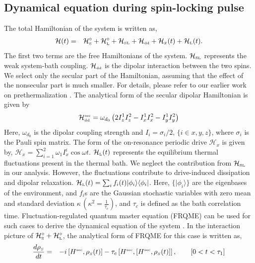\documentclass[pra,aps,preprint,floatfix]{revtex4-1}
\newcommand{\hs}{\mathcal{H}_{\scriptscriptstyle \rm S}}
\newcommand{\hl}{\mathcal{H}_{\scriptscriptstyle \rm L}}
\newcommand{\hsl}{\mathcal{H}_{\scriptscriptstyle \rm SL}}
\newcommand{\hdd}{\mathcal{H}_{\scriptscriptstyle \rm dd}}
\newcommand{\rh}{\rho_{\scriptscriptstyle  S}}
\begin{document}
\subsection{Dynamical equation during spin-locking pulse} \label{sub1}
The total Hamiltonian of the system is written as,
\begin{eqnarray}\label{ham}
\mathcal{H}(t)&=& \hs^{\circ} + \hl^{\circ}  + \hsl + \hdd + \mathcal{H}_x(t)+\hl(t).
\end{eqnarray} 
The first two terms are the free Hamiltonians of the system.
$\hsl$ represents the weak system-bath coupling. $\hdd$ is the dipolar interaction between the two spins. We 
select only the secular part of the Hamiltonian, assuming that the effect of the nonsecular part is much
smaller. For details, please refer to our earlier work on prethermalization \cite{saha_cascaded_2023}. The analytical 
form of the secular dipolar Hamiltonian is given by
\begin{eqnarray}
\hdd^{\scriptscriptstyle \rm sec} = \omega_{d_0}\left(2 I_z^1 I_z^2 - I_x^1 I_x^2 - I_y^1 I_y^2 \right)
\end{eqnarray}
Here, $\omega_{d_0}$ is the dipolar coupling strength and $I_i = \sigma_i/2, \, \{i \in x,y,z\}$, where $\sigma_i$ is the Pauli spin matrix. The form of the on-resonance periodic drive $\mathcal{H}_x$ is given by,
$\mathcal{H}_x =\sum\limits_{i=1}^2 \omega_1 I_{x}^i  \cos\omega t $. $\hl(t)$ represents the equilibrium thermal 
fluctuations present in the thermal bath. We neglect the contribution from $\hsl$ in our analysis. However,
the fluctuations contribute to drive-induced dissipation and dipolar relaxation.
$\hl(t) = \sum_i f_i(t)\vert \phi_i
\rangle \langle \phi_i \vert$. Here, $\{\vert\phi_i\rangle\}$ are the eigenbases of the environment, and  $f_i$s are the Gaussian stochastic variables with zero mean and standard deviation $\kappa \,
\left(\kappa^2=\frac{1}{\tau_c}\right)$, and $\tau_c$ is defined as the bath correlation time. Fluctuation-regulated 
quantum master equation (FRQME) can be used for such cases to derive the dynamical equation of the system 
\cite{chakrabarti2018b}. In the interaction picture of $ \hs^{\circ} + \hl^{\circ} $, the analytical form of FRQME 
for this case is written as, 
\begin{eqnarray}\label{dynamics-1}
\frac{d\rh}{dt}&=& -i\left[H^{\scriptscriptstyle \rm sec}, \rh(t)\right] -  \tau_c\left[ H^{\scriptscriptstyle \rm sec},\left[H^{\scriptscriptstyle \rm sec},\rh(t) \right] \right],\qquad [0<t<\tau_1]
\end{eqnarray}
\end{document}
